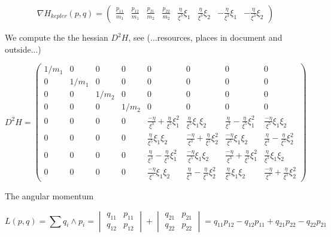 \documentclass[12pt]{article}
\begin{document}
\begin{equation}\label{eq:nabla hamiltonian kepler}
    \nabla H_{kepler}(p,q) = \begin{pmatrix} 
    \frac{p_{11}}{m_1} & \frac{p_{12}}{m_1} & \frac{p_{21}}{m_2} & \frac{p_{22}}{m_2} & 
    \frac\eta{\xi^3} \xi_1 & \frac\eta{\xi^3} \xi_2 & -\frac\eta{\xi^3} \xi_1 & -\frac\eta{\xi^3} \xi_2 
    \end{pmatrix}
\end{equation}

We compute the the hessian $D^2 H$, see (...resources, places in document and outside...)

\begin{equation}\label{eq:hessian of hamiltonian kepler}
    D^2 H =
    \left(\begin{array}{cccc|cccc}
    1/m_1 & 0 & 0 & 0    &    0 & 0 & 0 & 0\\
    0 & 1/m_1 & 0 & 0    &    0 & 0 & 0 & 0\\
    0 & 0 & 1/m_2 & 0    &    0 & 0 & 0 & 0\\
    0 & 0 & 0 & 1/m_2    &    0 & 0 & 0 & 0\\
    \hline 
    0 & 0 & 0 & 0        &    \frac{-\eta}{\xi^3} + \frac{\eta}{\xi^5}\xi_1^2 & \frac{\eta}{\xi^5}\xi_1\xi_2 & \frac{\eta}{\xi^3} - \frac{\eta}{\xi^5}\xi_1^2 & \frac{-\eta}{\xi^5}\xi_1\xi_2 \\
    0 & 0 & 0 & 0        &    \frac{\eta}{\xi^5}\xi_1\xi_2 & \frac{-\eta}{\xi^3} + \frac{\eta}{\xi^5}\xi_2^2 & \frac{-\eta}{\xi^5}\xi_1\xi_2 & \frac{\eta}{\xi^3} - \frac{\eta}{\xi^5}\xi_2^2 \\
    0 & 0 & 0 & 0        &    \frac{\eta}{\xi^3} - \frac{\eta}{\xi^5}\xi_1^2 & \frac{-\eta}{\xi^5}\xi_1\xi_2 & \frac{-\eta}{\xi^3} + \frac{\eta}{\xi^5}\xi_1^2 & \frac{\eta}{\xi^5}\xi_1\xi_2 \\
    0 & 0 & 0 & 0        &    \frac{-\eta}{\xi^5}\xi_1\xi_2 & \frac{\eta}{\xi^3} - \frac{\eta}{\xi^5}\xi_2^2 & \frac{\eta}{\xi^5}\xi_1\xi_2 & \frac{-\eta}{\xi^3} + \frac{\eta}{\xi^5}\xi_2^2
    \end{array}\right)
\end{equation}

The angular momentum 

\begin{equation}\label{eq:angular momentum kepler}
    L(p,q) = \sum q_i\wedge p_i = \begin{vmatrix} q_{11} & p_{11}\\ q_{12} & p_{12} \end{vmatrix} + \begin{vmatrix} q_{21} & p_{21}\\ q_{22} & p_{22} \end{vmatrix} = q_{11}p_{12} - q_{12}p_{11} + q_{21}p_{22} - q_{22}p_{21}
\end{equation}
\end{document}
